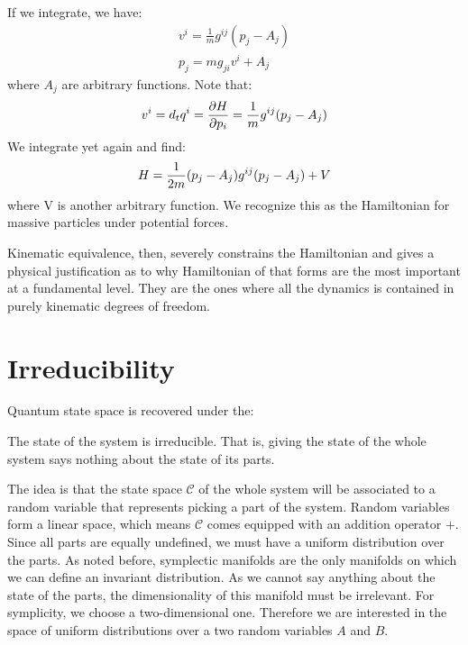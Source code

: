 \documentclass[11pt,letterpaper,fleqn]{memoir} %
\begin{document}
If we integrate, we have:
\begin{equation}
\begin{aligned}
v^i = \frac{1}{m} g^{ij}(p_j - A_j) \\
p_j = m g_{ji} v^i + A_j
\end{aligned}
\end{equation}
where $A_j$ are arbitrary functions. Note that:
\begin{equation}
v^i = d_t q^i = \frac{\partial H }{\partial p_i} = \frac{1}{m} g^{ij}(p_j - A_j) \\
\end{equation}
We integrate yet again and find:
\begin{equation}
H = \frac{1}{2m} (p_j - A_j) g^{ij}(p_j - A_j) + V \\
\end{equation}
where V is another arbitrary function. We recognize this as the Hamiltonian for massive particles under potential forces.

Kinematic equivalence, then, severely constrains the Hamiltonian and gives a physical justification as to why Hamiltonian of that forms are the most important at a fundamental level. They are the ones where all the dynamics is contained in purely kinematic degrees of freedom.

\section{Irreducibility}

Quantum state space is recovered under the:
\begin{assump}[Irreducibility]
	The state of the system is irreducible. That is, giving the state of the whole system says nothing about the state of its parts.
\end{assump}

The idea is that the state space $\mathcal{C}$ of the whole system will be associated to a random variable that represents picking a part of the system. Random variables form a linear space, which means $\mathcal{C}$ comes equipped with an addition operator $+$. Since all parts are equally undefined, we must have a uniform distribution over the parts. As noted before, symplectic manifolds are the only manifolds on which we can define an invariant distribution. As we cannot say anything about the state of the parts, the dimensionality of this manifold must be irrelevant. For symplicity, we choose a two-dimensional one. Therefore we are interested in the space of uniform distributions over a two random variables $A$ and $B$.
\end{document}
